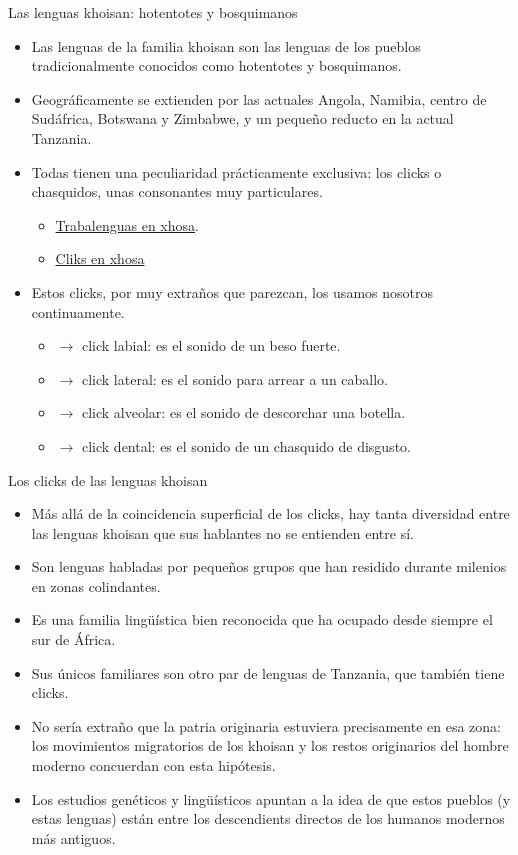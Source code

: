 \documentclass[handout]{beamer}
\begin{document}
\begin{frame}{Las lenguas khoisan: hotentotes y bosquimanos}
\begin{itemize}
	\item Las lenguas de la familia khoisan son las lenguas de los pueblos tradicionalmente conocidos como hotentotes y bosquimanos.
	\item Geográficamente se extienden por las actuales Angola, Namibia, centro de Sudáfrica, Botswana y Zimbabwe, y un pequeño reducto en la actual Tanzania.
	\item Todas tienen una peculiaridad prácticamente exclusiva: los clicks o chasquidos, unas consonantes muy particulares.
	\begin{itemize}
		\item \href{http://www.youtube.com/watch?v=pGUzL2DVblc&feature=related\#}{Trabalenguas en xhosa}.
		\item \href{http://www.youtube.com/watch?v=gytCi5a7AJg}{Cliks en xhosa}
	\end{itemize}
	\pause
	\item Estos clicks, por muy extraños que parezcan, los usamos nosotros continuamente.
	\begin{itemize}
		\item [\ipa{\!o}] $\rightarrow$ click labial: es el sonido de un beso fuerte.
		\item [\ipa{//}] $\rightarrow$ click lateral: es el sonido para arrear a un caballo.
		\item [\ipa{!}] $\rightarrow$ click alveolar: es el sonido de descorchar una botella.
		\item [\ipa{|}] $\rightarrow$ click dental: es el sonido de un chasquido de disgusto.
	\end{itemize}
\end{itemize}
\end{frame}

\begin{frame}{Los clicks de las lenguas khoisan}
\begin{itemize}
	\item Más allá de la coincidencia superficial de los clicks, hay tanta diversidad entre las lenguas khoisan que sus hablantes no se entienden entre sí.
	\item Son lenguas habladas por pequeños grupos que han residido durante milenios en zonas colindantes.
	\item Es una familia lingüística bien reconocida que ha ocupado desde siempre el sur de África.
	\item Sus únicos familiares son otro par de lenguas de Tanzania, que también tiene clicks. 
	\item No sería extraño que la patria originaria estuviera precisamente en esa zona: los movimientos migratorios de los khoisan y los restos originarios del hombre moderno concuerdan con esta hipótesis.
	\item Los estudios genéticos y lingüísticos apuntan a la idea de que estos pueblos (y estas lenguas) están entre los descendients directos de los humanos modernos más antiguos.
\end{itemize}
\end{frame}
\end{document}
